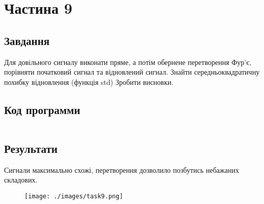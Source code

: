 \section{Частина 9}
\label{sec:task9}

\subsection{Завдання}
\label{subsec:task9_task}

Для довільного сигналу виконати пряме, а потім обернене
перетворення Фур’є, порівняти початковий сигнал та відновлений сигнал.
Знайти середньоквадратичну похибку відновлення (функція std)
Зробити висновки.

\subsection{Код программи}
\label{subsec:task9_code}
\inputminted{python}{../src/task9.py}

\subsection{Результати}
\label{subsec:task9_results}

Сигнали максимально схожі, перетворення дозволило позбутись небажаних складових.

\begin{figure}[!ht]
    \centering
    \texttt{[image: ./images/task9.png]}
\end{figure}
